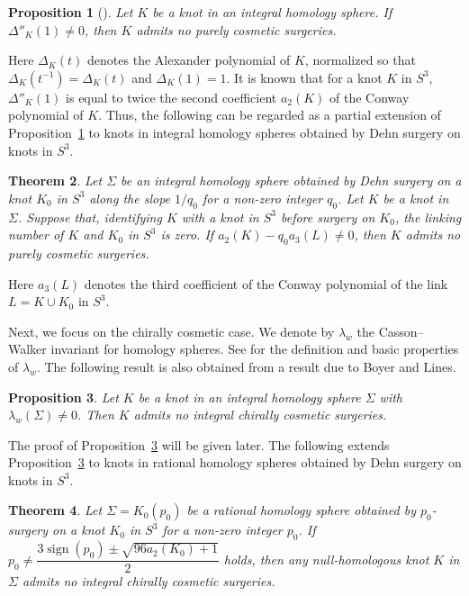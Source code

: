 \documentclass{amsart}
\newtheorem{theorem}{Theorem}
\newtheorem{proposition}[theorem]{Proposition}
\theoremstyle{remark}
\newcommand{\sign}{\mathop{\mathrm{sign}}\nolimits}
\begin{document}
\begin{proposition}[{\cite[(5.1) Proposition (iii)]{BoyerLines}}]\label{prop:BL2}
Let $K$ be a knot in an integral homology sphere. 
If $\Delta''_K(1) \ne 0$, 
then $K$ admits no purely cosmetic surgeries. 
\end{proposition}


Here $\Delta_K(t)$ denotes the Alexander polynomial of $K$, normalized so that $\Delta_K(t^{-1}) = \Delta_K(t)$ and $\Delta_K(1) = 1$.
It is known that for a knot $K$ in $S^3$, $\Delta''_K(1)$ is equal to twice the second coefficient $a_2(K)$ of the Conway polynomial of $K$.
Thus, the following can be regarded as a partial extension of Proposition~\ref{prop:BL2} to knots in integral homology spheres obtained by Dehn surgery on knots in $S^3$.

\begin{theorem}\label{thm:integral}
    Let $\Sigma$ be an integral homology sphere obtained by Dehn surgery on a knot $K_0$ in $S^3$ along the slope $1/{q_0}$ for a non-zero integer $q_0$. 
    Let $K$ be a knot in $\Sigma$. 
    Suppose that, identifying $K$ with a knot in $S^3$ before surgery on $K_0$, the linking number of $K$ and $K_0$ in $S^3$ is zero. 
    If $a_2 (K) - q_0 a_3(L) \ne 0$, then $K$ admits no purely cosmetic surgeries. 
\end{theorem}

Here $a_3(L)$ denotes the third coefficient of the Conway polynomial of the link $L = K \cup K_0$ in $S^3$. 

Next, we focus on the chirally cosmetic case.
We denote by $\lambda_w$ the Casson--Walker invariant for homology spheres.
See \cite{Walker} for the definition and basic properties of $\lambda_w$.
The following result is also obtained from a result due to Boyer and Lines.


\begin{proposition}\label{prop:BL3}
    Let $K$ be a knot in an integral homology sphere $\Sigma$ with $\lambda_w(\Sigma) \ne 0$. 
    Then $K$ admits no integral chirally cosmetic surgeries. 
\end{proposition}

The proof of Proposition~\ref{prop:BL3} will be given later.
The following extends Proposition~\ref{prop:BL3} to knots in rational homology spheres obtained by Dehn surgery on knots in $S^3$.

\begin{theorem}\label{thm:chirally}
    Let $\Sigma = K_0(p_0)$ be a rational homology sphere obtained by $p_0$-surgery on a knot $K_0$ in $S^3$ for a non-zero integer $p_0$. 
    If $p_0 \ne \dfrac{3 \sign(p_0) \pm \sqrt{96a_2(K_0)+1}}{2}$ holds, then any null-homologous knot $K$ in $\Sigma$ admits no integral chirally cosmetic surgeries. 
\end{theorem}
\end{document}
